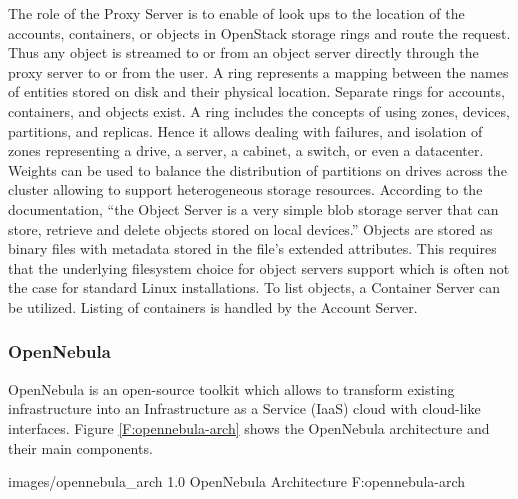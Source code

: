 The role of the Proxy Server is to enable of look ups to the location of the accounts, containers, or objects in OpenStack storage rings and route the request. Thus any object is streamed to or from an object server directly through the proxy server to or from the user. A ring represents a mapping between the names of entities stored on disk and their physical location. Separate rings for accounts, containers, and objects exist. A ring includes the concepts of using zones, devices, partitions, and replicas. Hence it allows dealing with failures, and isolation of zones representing a drive, a server, a cabinet, a switch, or even a datacenter. Weights can be used to balance the distribution of partitions on drives across the cluster allowing to support heterogeneous storage resources. According to the documentation, ``the Object Server is a very simple blob storage server that can store, retrieve and delete objects stored on local devices.''  Objects are stored as binary files with metadata stored in the file's extended attributes. This requires that the underlying filesystem choice for object servers support which is often not the case for standard Linux installations. To list objects, a Container Server can be utilized. Listing of containers is handled by the Account Server.
 


\subsubsection{OpenNebula}

OpenNebula \cite{www/opennebula, llorentecloud} is an open-source toolkit which allows to transform existing infrastructure into an Infrastructure as a Service (IaaS) cloud with cloud-like interfaces. Figure \ref{F:opennebula-arch} shows the OpenNebula architecture and their main components.

  {images/opennebula_arch}
  {1.0}
  {OpenNebula Architecture}
  {F:opennebula-arch}

